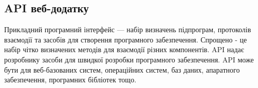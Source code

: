 \subsection{API веб-додатку}

Прикладний програмний інтерфейс — набір визначень підпрограм, протоколів взаємодії та засобів для створення програмного забезпечення. Спрощено - це набір чітко визначених методів для взаємодії різних компонентів. API надає розробнику засоби для швидкої розробки програмного забезпечення. API може бути для веб-базованих систем, операційних систем, баз даних, апаратного забезпечення, програмних бібліотек тощо.

